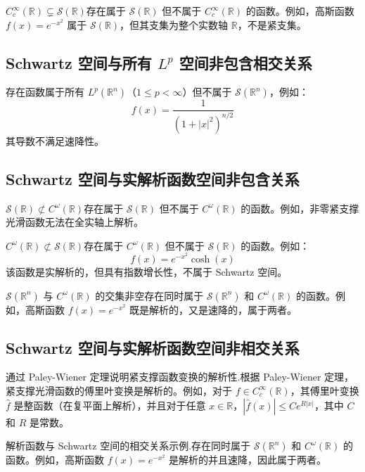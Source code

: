 \documentclass[12pt,a4paper]{article}
\theoremstyle{plain}
\theoremstyle{definition}
\theoremstyle{remark}
\begin{document}
\( C_c^\infty(\mathbb{R}) \subsetneq \mathcal{S}(\mathbb{R}) \)存在属于 \(\mathcal{S}(\mathbb{R})\) 但不属于 \(C_c^\infty(\mathbb{R})\) 的函数。例如，高斯函数 \( f(x) = e^{-x^2} \) 属于 \(\mathcal{S}(\mathbb{R})\)，但其支集为整个实数轴 \(\mathbb{R}\)，不是紧支集。

\subsection{Schwartz 空间与所有 \( L^p \) 空间非包含相交关系}
存在函数属于所有 \( L^p(\mathbb{R}^n) \)（\(1 \leq p < \infty\)）但不属于 \(\mathcal{S}(\mathbb{R}^n)\)，例如：
\[
f(x) = \frac{1}{(1 + |x|^2)^{n/2}}
\]
其导数不满足速降性。

\subsection{Schwartz 空间与实解析函数空间非包含关系}

\( \mathcal{S}(\mathbb{R}) \not\subset C^\omega(\mathbb{R}) \)存在属于 \(\mathcal{S}(\mathbb{R})\) 但不属于 \(C^\omega(\mathbb{R})\) 的函数。例如，非零紧支撑光滑函数无法在全实轴上解析。

\( C^\omega(\mathbb{R}) \not\subset \mathcal{S}(\mathbb{R}) \)存在属于 \(C^\omega(\mathbb{R})\) 但不属于 \(\mathcal{S}(\mathbb{R})\) 的函数。例如：
\[
f(x) = e^{-x^2} \cosh(x)
\]
该函数是实解析的，但具有指数增长性，不属于 Schwartz 空间。

\( \mathcal{S}(\mathbb{R}^n) \) 与 \( C^\omega(\mathbb{R}) \) 的交集非空存在同时属于 \(\mathcal{S}(\mathbb{R}^n)\) 和 \( C^\omega(\mathbb{R}) \) 的函数。例如，高斯函数 \( f(x) = e^{-x^2} \) 既是解析的，又是速降的，属于两者。

\subsection{Schwartz 空间与实解析函数空间非相交关系}

通过 Paley-Wiener 定理说明紧支撑函数变换的解析性.根据 Paley-Wiener 定理，紧支撑光滑函数的傅里叶变换是解析的。例如，对于 \( f \in C_c^\infty(\mathbb{R}) \)，其傅里叶变换 \( \hat{f} \) 是整函数（在复平面上解析），并且对于任意 \( x \in \mathbb{R} \)，\( |\hat{f}(x)| \leq C e^{R|x|} \)，其中 \( C \) 和 \( R \) 是常数。

解析函数与 Schwartz 空间的相交关系示例.存在同时属于 \( \mathcal{S}(\mathbb{R}^n) \) 和 \( C^\omega(\mathbb{R}) \) 的函数。例如，高斯函数 \( f(x) = e^{-x^2} \) 是解析的并且速降，因此属于两者。
\end{document}
